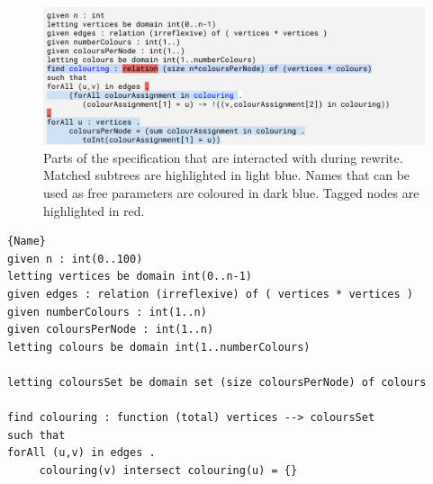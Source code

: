\documentclass[anonymous,a4paper,UKenglish,cleveref,pdfa]{lipics-v2021}
\newcommand{\zap}[1]{}
\begin{document}
\begin{figure}[ht]
    \centering
    \includegraphics[width=\columnwidth]{CP2024-midrewrite.pdf}
    \caption{Parts of the specification that are interacted with during rewrite. Matched subtrees are highlighted in light blue. Names that can be used as free parameters are coloured in dark blue. Tagged nodes are highlighted in red.}
\end{figure}

\zap{
\begin{lstlisting}[caption={Matching during rewriting},label={lst:during},frame=tlrb,style=plain,classoffset=0,morekeywords={colouring},keywordstyle=\color{blue},classoffset=1,morekeywords={sum},keywordstyle=\color{red}]{Name}
given n : int
letting vertices be domain int(0..n-1)
given edges : relation (irreflexive) of ( vertices * vertices )
given numberColours : int(1..)
given coloursPerNode : int(1..)
letting colours be domain int(1..numberColours)
find colouring : relation (size n*coloursPerNode) of (vertices * colours)
such that

forAll (u,v) in edges .
     (forAll colourAssignment in colouring .
        (colourAssignment[1] = u) -> !((v,colourAssignment[2]) in colouring)),

forAll u : vertices .
     coloursPerNode = (sum colourAssignment in colouring .
        toInt(colourAssignment[1] = u))
\end{lstlisting}
}

\zap{
\noindent\texttt{\footnotesize%
given n : int\\
letting vertices be {\color{red}domain int(0..n-1)}\\
given edges : relation (irreflexive) of ( vertices * vertices )
}
}

\begin{lstlisting}[caption=Rewritten specification.,label={lst:after},frame=tlrb]{Name}
given n : int(0..100)
letting vertices be domain int(0..n-1)
given edges : relation (irreflexive) of ( vertices * vertices )
given numberColours : int(1..n)
given coloursPerNode : int(1..n)
letting colours be domain int(1..numberColours)

letting coloursSet be domain set (size coloursPerNode) of colours

find colouring : function (total) vertices --> coloursSet
such that
forAll (u,v) in edges .
     colouring(v) intersect colouring(u) = {}
\end{lstlisting}
\end{document}
